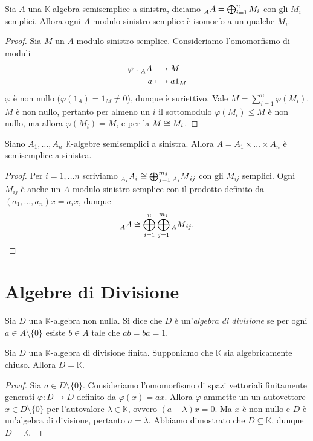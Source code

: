 \begin{proposition}
Sia $A$ una $\mathbb{K}$-algebra semisemplice a sinistra, diciamo $\prescript{}{A}{A}=\bigoplus_{i=1}^{n}M_i$ con gli $M_i$ semplici. Allora ogni $A$-modulo sinistro semplice è isomorfo a un qualche $M_i$.
\end{proposition}
\begin{proof}
Sia $M$ un $A$-modulo sinistro semplice. Consideriamo l'omomorfismo di moduli
\begin{align*}
\varphi:\prescript{}{A}{A}&\longrightarrow M\\
a&\longmapsto a1_M
\end{align*}
$\varphi$ è non nullo ($\varphi(1_A)=1_M\neq 0$), dunque è suriettivo. Vale $M=\sum_{i=1}^{n}\varphi(M_i)$. $M$ è non nullo, pertanto per almeno un $i$ il sottomodulo $\varphi(M_i)\le M$ è non nullo, ma allora $\varphi(M_i)=M$, e per la  $M\cong M_i$.
\end{proof}


\begin{proposition}
Siano $A_1,\ldots,A_n$ $\mathbb{K}$-algebre semisemplici a sinistra. Allora $A=A_1\times\ldots\times A_n$ è semisemplice a sinistra.
\end{proposition}
\begin{proof}
Per $i=1,\ldots n$ scriviamo $\prescript{}{A_i}{A}_i\cong\bigoplus_{j=1}^{m_j}\prescript{}{A_i}{M}_{ij}$ con gli $M_{ij}$ semplici. Ogni $M_{ij}$ è anche un $A$-modulo sinistro semplice con il prodotto definito da $(a_1,\ldots,a_n)x=a_ix$, dunque
$$
\prescript{}{A}{A}\cong\bigoplus_{i=1}^{n}\bigoplus_{j=1}^{m_j}\prescript{}{A}{M}_{ij}.
$$
\end{proof}



\section{Algebre di Divisione}

\begin{definition}
Sia $D$ una $\mathbb{K}$-algebra non nulla. Si dice che $D$ è un'\emph{algebra di divisione} se per ogni $a\in A\setminus\{0\}$ esiste $b\in A$ tale che $ab=ba=1$.
\end{definition}


\begin{proposition}
Sia $D$ una $\mathbb{K}$-algebra di divisione finita. Supponiamo che $\mathbb{K}$ sia algebricamente chiuso. Allora $D=\mathbb{K}$.
\end{proposition}
\begin{proof}
Sia $a\in D\setminus\{0\}$. Consideriamo l'omomorfismo di spazi vettoriali finitamente generati $\varphi:D\to D$ definito da $\varphi(x)=ax$.  Allora $\varphi$ ammette un un autovettore $x\in D\setminus\{0\}$ per l'autovalore $\lambda\in\mathbb{K}$, ovvero $(a-\lambda)x=0$. Ma $x$ è non nullo e $D$ è un'algebra di divisione, pertanto $a=\lambda$. Abbiamo dimostrato che $D\subseteq\mathbb{K}$, dunque $D=\mathbb{K}$.
\end{proof}


